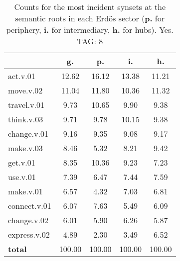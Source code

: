 \begin{table}[h!]
\begin{center}
\begin{tabular}{| l | c | c | c | c |}\hline
 & g. & p. & i. & h. \\\hline
act.v.01 & 12.62  & 16.12  & 13.38  & 11.21 \\\hline
move.v.02 & 11.04  & 11.80  & 10.36  & 11.32 \\\hline
travel.v.01 & 9.73  & 10.65  & 9.90  & 9.38 \\\hline
think.v.03 & 9.71  & 9.78  & 10.15  & 9.38 \\\hline
change.v.01 & 9.16  & 9.35  & 9.08  & 9.17 \\\hline
make.v.03 & 8.46  & 5.32  & 8.21  & 9.42 \\\hline
get.v.01 & 8.35  & 10.36  & 9.23  & 7.23 \\\hline
use.v.01 & 7.39  & 6.47  & 7.44  & 7.59 \\\hline
make.v.01 & 6.57  & 4.32  & 7.03  & 6.81 \\\hline
connect.v.01 & 6.07  & 7.63  & 5.49  & 6.09 \\\hline
change.v.02 & 6.01  & 5.90  & 6.26  & 5.87 \\\hline
express.v.02 & 4.89  & 2.30  & 3.49  & 6.52 \\\hline
{{\bf total}} & 100.00  & 100.00  & 100.00  & 100.00 \\\hline
\end{tabular}
\caption{Counts for the most incident synsets at the semantic roots in each Erd\"os sector ({\bf p.} for periphery, {\bf i.} for intermediary, {\bf h.} for hubs). Yes. TAG: 8}
\end{center}
\end{table}